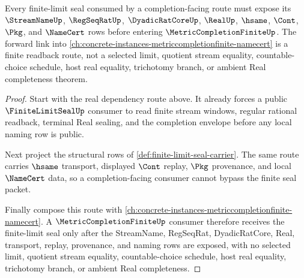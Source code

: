 \begin{theorem}
\label{thm:finite-limit-seal-metriccompletionfinite-forward-link}
Every finite-limit seal consumed by a completion-facing route must expose its $\StreamNameUp$, $\RegSeqRatUp$, $\DyadicRatCoreUp$, $\RealUp$, $\hsame$, $\Cont$, $\Pkg$, and $\NameCert$ rows before entering $\MetricCompletionFiniteUp$. The forward link into \autoref{ch:concrete-instances-metriccompletionfinite-namecert} is a finite readback route, not a selected limit, quotient stream equality, countable-choice schedule, host real equality, trichotomy branch, or ambient Real completeness theorem.
\end{theorem}
\begin{proof}
Start with the real dependency route above. It already forces a public $\FiniteLimitSealUp$ consumer to read finite stream windows, regular rational readback, terminal Real sealing, and the completion envelope before any local naming row is public.

Next project the structural rows of \autoref{def:finite-limit-seal-carrier}. The same route carries $\hsame$ transport, displayed $\Cont$ replay, $\Pkg$ provenance, and local $\NameCert$ data, so a completion-facing consumer cannot bypass the finite seal packet.

Finally compose this route with \autoref{ch:concrete-instances-metriccompletionfinite-namecert}. A $\MetricCompletionFiniteUp$ consumer therefore receives the finite-limit seal only after the StreamName, RegSeqRat, DyadicRatCore, Real, transport, replay, provenance, and naming rows are exposed, with no selected limit, quotient stream equality, countable-choice schedule, host real equality, trichotomy branch, or ambient Real completeness.
\end{proof}

